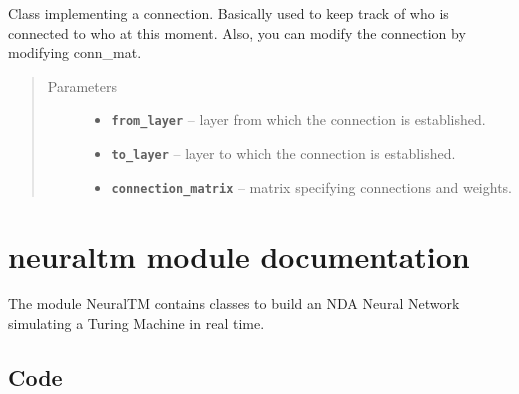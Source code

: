 \documentclass[letterpaper,10pt,english]{sphinxmanual}
\begin{document}
\begin{fulllineitems}
\label{simpleNNlib_docs:simpleNNlib.Connection}
Class implementing a connection. Basically used to keep track of who is connected to who at this moment.
Also, you can modify the connection by modifying conn\_mat.
\begin{quote}\begin{description}
\item[{Parameters}] \leavevmode\begin{itemize}
\item {} 
\textbf{\texttt{from\_layer}} -- layer from which the connection is established.

\item {} 
\textbf{\texttt{to\_layer}} -- layer to which the connection is established.

\item {} 
\textbf{\texttt{connection\_matrix}} -- matrix specifying connections and weights.

\end{itemize}

\end{description}\end{quote}

\end{fulllineitems}



\chapter{neuraltm module documentation}
\label{neuraltm_docs:neuraltm-module-documentation}\label{neuraltm_docs::doc}
The module NeuralTM contains classes to build an NDA Neural Network simulating a Turing Machine in real time.


\section{Code}
\label{neuraltm_docs:code}\label{neuraltm_docs:module-neuraltm}
\end{document}
